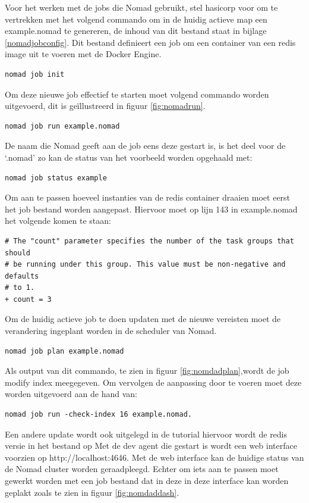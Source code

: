 Voor het werken met de jobs die Nomad gebruikt, stel hasicorp voor om te vertrekken met het volgend commando om in de huidig actieve map een example.nomad te genereren, de inhoud van dit bestand staat in bijlage \ref{nomadjobconfig}. Dit bestand definieert een job om een container van een redis image uit te voeren met de Docker Engine.
\begin{verbatim}
nomad job init
\end{verbatim}
Om deze nieuwe job effectief te starten moet volgend commando worden uitgevoerd, dit is geïllustreerd  in figuur \ref{fig:nomadrun}.
\begin{verbatim}
nomad job run example.nomad
\end{verbatim}
De naam die Nomad geeft aan de job eens deze gestart is, is het deel voor de ‘.nomad’ zo kan de status van het voorbeeld worden opgehaald met:
\begin{verbatim}
nomad job status example
\end{verbatim}
Om aan te passen hoeveel instanties van de redis container draaien moet eerst het job bestand worden aangepast. Hiervoor moet op lijn 143 in example.nomad het volgende komen te staan:
\begin{verbatim}
# The "count" parameter specifies the number of the task groups that should
# be running under this group. This value must be non-negative and defaults
# to 1.
+ count = 3
\end{verbatim}
Om de huidig actieve job te doen updaten met de nieuwe vereisten moet de verandering ingeplant worden in de scheduler van Nomad.
\begin{verbatim}
nomad job plan example.nomad
\end{verbatim}
Als output van dit commando, te zien in figuur \ref{fig:nomdadplan},wordt de job modify index meegegeven. Om vervolgen de aanpassing door te voeren moet deze worden uitgevoerd aan de hand van:
\begin{verbatim}
nomad job run -check-index 16 example.nomad.
\end{verbatim}
Een andere update wordt ook uitgelegd in de tutorial hiervoor wordt de redis versie in het bestand op Met de dev agent die gestart is wordt een web interface voorzien op http://localhost:4646. Met de web interface kan de huidige status van de Nomad cluster worden geraadpleegd. Echter om iets aan te passen moet gewerkt worden met een job bestand dat in deze in deze interface kan worden geplakt zoals te zien in figuur \ref{fig:nomdaddash}.

